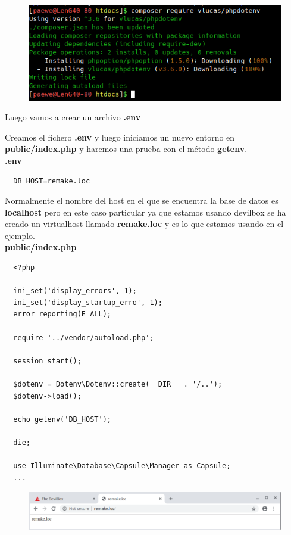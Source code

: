 \documentclass{article}
\begin{document}
\begin{figure}[h!]
  \centering
  \includegraphics[scale=0.5]{./Pictures/221_dotenv.png}
\end{figure}

Luego vamos a crear un archivo \textbf{.env}

Creamos el fichero \textbf{.env} y luego iniciamos un nuevo entorno en
\textbf{public/index.php} y haremos una prueba con el método \textbf{getenv}.\\

\textbf{.env}
\begin{verbatim}
  DB_HOST=remake.loc
\end{verbatim}

Normalmente el nombre del host en el que se encuentra la base de datos es
\textbf{localhost} pero en este caso particular ya que estamos usando devilbox
se ha creado un virtualhost llamado \textbf{remake.loc} y es lo que estamos
usando en el ejemplo.\\

\textbf{public/index.php}
\begin{verbatim}
  <?php

  ini_set('display_errors', 1);
  ini_set('display_startup_erro', 1);
  error_reporting(E_ALL);

  require '../vendor/autoload.php';

  session_start();

  $dotenv = Dotenv\Dotenv::create(__DIR__ . '/..');
  $dotenv->load();

  echo getenv('DB_HOST');

  die;

  use Illuminate\Database\Capsule\Manager as Capsule;
  ...
\end{verbatim}

\begin{figure}[h!]
  \centering
  \includegraphics[scale=0.5]{./Pictures/222_getenv.png}
\end{figure}
\end{document}
